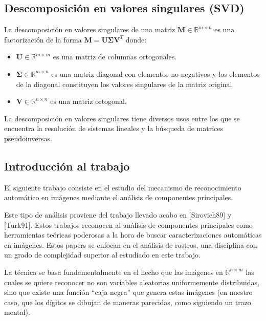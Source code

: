 \subsection{Descomposici\'on en valores singulares (SVD)}

La descomposici\'on en valores singulares de una matriz $\mathbf{M} \in \mathbb{R}^{m \times n}$ es una factorizaci\'on de la forma $\mathbf{M} =
\mathbf{U} \boldsymbol{\Sigma} \mathbf{V}^T$ donde:

\begin{itemize}
  \item $\mathbf{U} \in \mathbb{R}^{m \times m}$ es una matriz de columnas ortogonales.
  \item $\boldsymbol{\Sigma} \in \mathbb{R}^{m \times n}$ es una matriz diagonal con elementos no negativos y los elementos de la
diagonal constituyen los valores singulares de la matriz original.
  \item $\mathbf{V} \in \mathbb{R}^{n \times n}$ es una matriz ortogonal.
\end{itemize}

La descomposici\'on en valores singulares tiene diversos usos entre los que se encuentra la resoluci\'on de
sistemas lineales y la b\'usqueda de matrices pseudoinversas.

\subsection{Introducci\'on al trabajo}

El siguiente trabajo consiste en el estudio del mecanismo de reconocimiento autom\'atico
en im\'agenes mediante el an\'alisis de componentes principales.

Este tipo de an\'alisis proviene del trabajo llevado acabo en [Sirovich89] y [Turk91]. Estos
trabajos reconocen al an\'alisis de componentes principales como herramientas te\'oricas poderosas
a la hora de buscar caracterizaciones autom\'aticas en im\'agenes. Estos papers se enfocan en el
an\'alisis de rostros, una disciplina con un grado de complejidad superior al estudiado en este
trabajo.

La t\'ecnica se basa fundamentalmente en el hecho que las im\'agenes en $\mathbb{R}^{n \times m}$ las cuales se
quiere reconocer no son variables aleatorias uniformemente distribuidas, sino
que existe una funci\'on ``caja negra'' que genera estas im\'agenes (en nuestro 
caso, que los d\'igitos se dibujan de maneras parecidas, como siguiendo un trazo mental).

